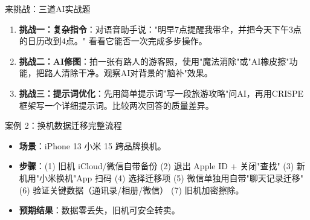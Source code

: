\begin{tcbpractice}{来挑战：三道AI实战题}
\begin{enumerate}
  \item \textbf{挑战一：复杂指令}：对语音助手说："明早7点提醒我带伞，并把今天下午3点的日历改到4点。" 看看它能否一次完成多步操作。
  \item \textbf{挑战二：AI修图}：拍一张有路人的游客照，使用"魔法消除"或"AI橡皮擦"功能，把路人清除干净。观察AI对背景的"脑补"效果。
  \item \textbf{挑战三：提示词优化}：先用简单提示词"写一段旅游攻略"问AI，再用CRISPE框架写一个详细提示词。比较两次回答的质量差异。
\end{enumerate}

\end{tcbpractice}

\begin{tcbinfo}{案例 2：换机数据迁移完整流程}
\begin{itemize}
  \item \textbf{场景}：iPhone 13 小米 15 跨品牌换机。
  \item \textbf{步骤}：(1) 旧机 iCloud/微信自带备份 (2) 退出 Apple ID + 关闭"查找" (3) 新机用"小米换机"App 扫码 (4) 选择迁移项 (5) 微信单独用自带"聊天记录迁移" (6) 验证关键数据（通讯录/相册/微信） (7) 旧机加密擦除。
  \item \textbf{预期结果}：数据零丢失，旧机可安全转卖。
\end{itemize}

\end{tcbinfo}
